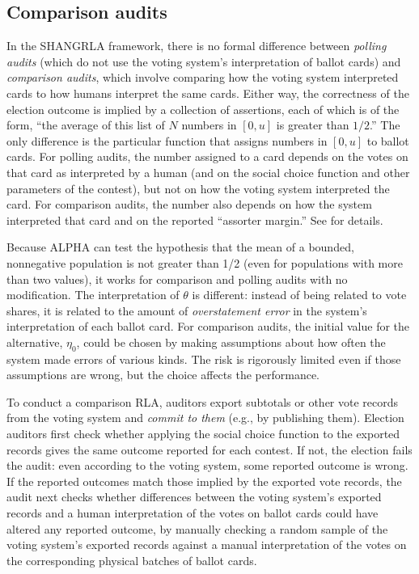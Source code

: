 \documentclass[aoas]{imsart}
\begin{document}
\subsection{Comparison audits} \label{sec:comparison-audits}
In the SHANGRLA framework, there is no formal difference between \emph{polling audits} (which do not use the voting system's
interpretation of ballot cards) and \emph{comparison audits}, which involve comparing how the voting system interpreted cards to 
how humans interpret the same cards.
Either way, the correctness of the election outcome is implied by a collection of assertions, each of which is of the form, 
``the average of this list of $N$ numbers in $[0, u]$ is greater than $1/2$.''
The only difference is the particular function that assigns numbers in $[0, u]$ to ballot cards.
For polling audits, the number assigned to a card depends on the votes on that card as interpreted by a human (and on the social
choice function and other parameters of the contest), but not on how the voting system interpreted the card.
For comparison audits, the number also depends on how the system interpreted that card and on the reported ``assorter margin.''
See \citet[Section 3.2]{stark20} for details.

Because ALPHA can test the hypothesis that the mean of a bounded, nonnegative population is not greater than 1/2 
(even for populations with more than two values), it works for comparison and polling audits with no modification.
The interpretation of $\theta$ is different: instead of being related to vote shares, it is related to the amount of \emph{overstatement error}
in the system's interpretation of each ballot card.
For comparison audits, the initial value for the alternative, $\eta_0$, could be chosen by making assumptions 
about how often the system made errors of various kinds.
The risk is rigorously limited even if those assumptions are wrong, but the choice affects the performance.

To conduct a comparison RLA, auditors export subtotals or other vote records from the voting system and \emph{commit to them} 
(e.g., by publishing them).
Election auditors first check whether applying the social choice function to the exported records gives the same outcome
reported for each contest.
If not, the election fails the audit: even according to the voting system, some
reported outcome is wrong.
If the reported outcomes match those implied by the exported vote records, the audit next checks whether differences between the voting system's exported records and a human interpretation
of the votes on ballot cards could have altered any reported outcome, by
manually checking a random sample of the voting system's exported records against a manual interpretation of
the votes on the corresponding physical batches of ballot cards.
\end{document}
